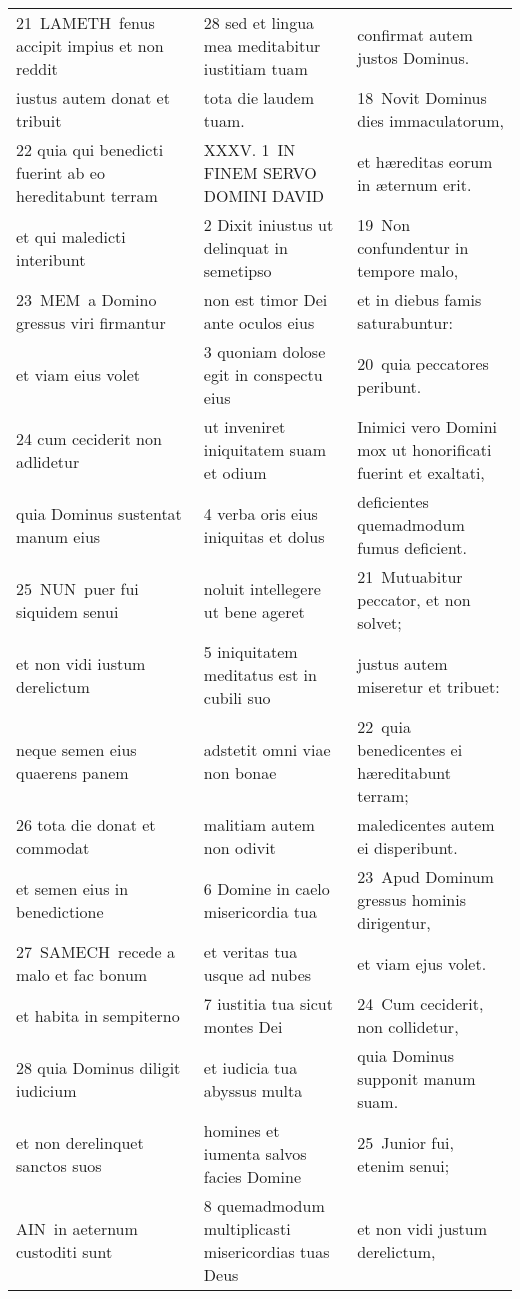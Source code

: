 \documentclass{article}
\begin{document}
\begin{longtable}{@{}p{}p{}p{}@{}}
21 LAMETH fenus accipit impius et non reddit	&	28 sed et lingua mea meditabitur iustitiam tuam	&	confirmat autem justos Dominus.	\\
iustus autem donat et tribuit	&	tota die laudem tuam.	&	18 Novit Dominus dies immaculatorum,	\\
22 quia qui benedicti fuerint ab eo hereditabunt terram	&	XXXV. 1 IN FINEM SERVO DOMINI DAVID	&	et hæreditas eorum in æternum erit.	\\
et qui maledicti interibunt	&	2 Dixit iniustus ut delinquat in semetipso	&	19 Non confundentur in tempore malo,	\\
23 MEM a Domino gressus viri firmantur	&	non est timor Dei ante oculos eius	&	et in diebus famis saturabuntur:	\\
et viam eius volet	&	3 quoniam dolose egit in conspectu eius	&	20 quia peccatores peribunt.	\\
24 cum ceciderit non adlidetur	&	ut inveniret iniquitatem suam et odium	&	Inimici vero Domini mox ut honorificati fuerint et exaltati,	\\
quia Dominus sustentat manum eius	&	4 verba oris eius iniquitas et dolus	&	deficientes quemadmodum fumus deficient.	\\
25 NUN puer fui siquidem senui	&	noluit intellegere ut bene ageret	&	21 Mutuabitur peccator, et non solvet;	\\
et non vidi iustum derelictum	&	5 iniquitatem meditatus est in cubili suo	&	justus autem miseretur et tribuet:	\\
neque semen eius quaerens panem	&	adstetit omni viae non bonae	&	22 quia benedicentes ei hæreditabunt terram;	\\
26 tota die donat et commodat	&	malitiam autem non odivit	&	maledicentes autem ei disperibunt.	\\
et semen eius in benedictione	&	6 Domine in caelo misericordia tua	&	23 Apud Dominum gressus hominis dirigentur,	\\
27 SAMECH recede a malo et fac bonum	&	et veritas tua usque ad nubes	&	et viam ejus volet.	\\
et habita in sempiterno	&	7 iustitia tua sicut montes Dei	&	24 Cum ceciderit, non collidetur,	\\
28 quia Dominus diligit iudicium	&	et iudicia tua abyssus multa	&	quia Dominus supponit manum suam.	\\
et non derelinquet sanctos suos	&	homines et iumenta salvos facies Domine	&	25 Junior fui, etenim senui;	\\
AIN in aeternum custoditi sunt	&	8 quemadmodum multiplicasti misericordias tuas Deus	&	et non vidi justum derelictum,	\\

\end{longtable}
\end{document}
